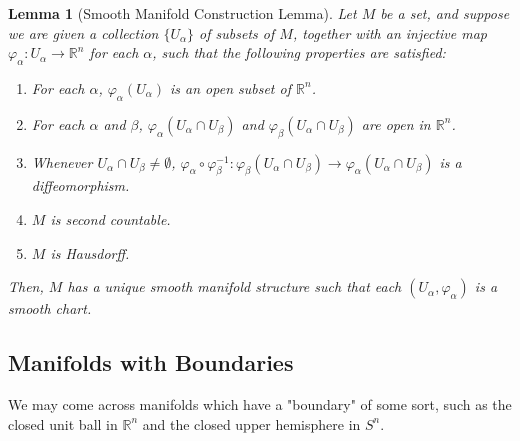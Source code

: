 \documentclass{article}
\newtheorem{lemma}[theorem]{Lemma}
\theoremstyle{remark}
\theoremstyle{definition}
\begin{document}
      \begin{lemma}[Smooth Manifold Construction Lemma]
        Let $M$ be a set, and suppose we are given a collection $\{U_\alpha\}$ of subsets of $M$, together with an injective map $\varphi_\alpha: U_\alpha \longrightarrow \mathbb{R}^n$ for each $\alpha$, such that the following properties are satisfied:
        \begin{enumerate}
          \item For each $\alpha$, $\varphi_\alpha (U_\alpha)$ is an open subset of $\mathbb{R}^n$.
          \item For each $\alpha$ and $\beta$, $\varphi_\alpha (U_\alpha \cap U_\beta)$ and $\varphi_\beta (U_\alpha \cap U_\beta)$ are open in $\mathbb{R}^n$. 
          \item Whenever $U_\alpha \cap U_\beta \neq \emptyset$, $\varphi_\alpha \circ \varphi_\beta^{-1}: \varphi_\beta (U_\alpha \cap U_\beta) \longrightarrow \varphi_\alpha (U_\alpha \cap U_\beta)$ is a diffeomorphism. 
          \item $M$ is second countable. 
          \item $M$ is Hausdorff. 
        \end{enumerate}
        Then, $M$ has a unique smooth manifold structure such that each $(U_\alpha, \varphi_\alpha)$ is a smooth chart. 
      \end{lemma}

  \subsection{Manifolds with Boundaries}

    We may come across manifolds which have a "boundary" of some sort, such as the closed unit ball in $\mathbb{R}^n$ and the closed upper hemisphere in $S^n$. 
\end{document}
